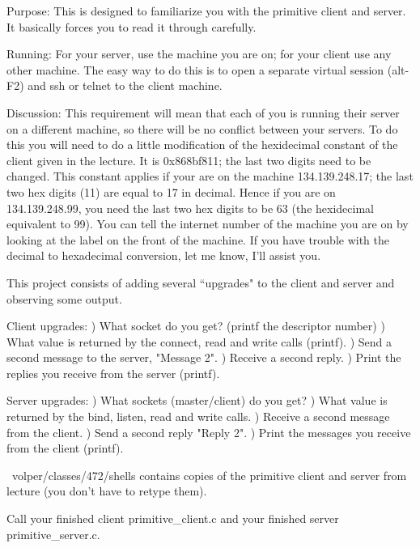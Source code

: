 

\parindent 0pt

Purpose: This is designed to familiarize you with the primitive client
and server. It basically forces you to read it through carefully.

Running: For your server, use the machine you are on;
for your client use any other machine.
The easy way to do this is to open a separate virtual session
(alt-F2) and ssh or telnet to the client machine.

Discussion: This requirement will mean that each of you is running
their server on a different machine, so there will be no conflict
between your servers.
To do this you will need to do a little modification of the
hexidecimal constant of the client given in the lecture.
It is 0x868bf811; the last two digits need to be changed.
This constant applies if your are on the machine 134.139.248.17;
the last two hex digits (11) are equal to 17 in decimal.
Hence if you are on 134.139.248.99, you need the last two hex digits
to be 63 (the hexidecimal equivalent to 99).
You can tell the internet number of the machine you are on by looking at the label
on the front of the machine.
If you have trouble with the decimal to hexadecimal conversion, let me
know, I'll assist you.

This project consists of adding several ``upgrades" to the client and
server and observing some output.

Client upgrades:
\hfill{}) What socket do you get? (printf the descriptor number)
\hfill{}) What value is returned by the connect, read and write calls (printf).
\hfill{}) Send a second message to the server, {\ltt{}"Message 2"}.
\hfill{}) Receive a second reply.
\hfill{}) Print the replies you receive from the server (printf).

Server upgrades:
\hfill{}) What sockets (master/client) do you get?
\hfill{}) What value is returned by the bind, listen, read and write calls.
\hfill{}) Receive a second message from the client.
\hfill{}) Send a second reply {\ltt{}"Reply 2"}.
\hfill{}) Print the messages you receive from the client (printf).

{\ltt{}~volper/classes/472/shells} contains copies
of the primitive client and server from lecture
(you don't have to retype them).

Call your finished client {\ltt{}primitive_client.c} and 
your finished server {\ltt{}primitive_server.c}.
\bye
